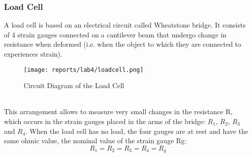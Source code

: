 \documentclass[12pt]{article}
\begin{document}
        \subsubsection{Load Cell}
            A load cell is based on an electrical circuit called Wheatstone bridge. It consists of 4 strain gauges connected on a cantilever beam that undergo change in resistance when deformed (i.e. when the object to which they are connected to experiences strain).
            \begin{figure}[H]
                \centering
                \texttt{[image: reports/lab4/loadcell.png]}
                \caption{Circuit Diagram of the Load Cell}
                \label{fig:loadcell}
            \end{figure}
            \\
            \noindent
            This arrangement allows to measure very small changes in the resistance R, which occurs in the strain gauges placed in the arms of the bridge: $R_1$, $R_2$, $R_3$ and $R_4$. When the load cell has no load, the four gauges are at rest and have the same ohmic value, the nominal value of the strain gauge Rg:
            \begin{equation}
                R_1 = R_2 = R_3 = R_4 = R_g 
            \end{equation}
\end{document}
